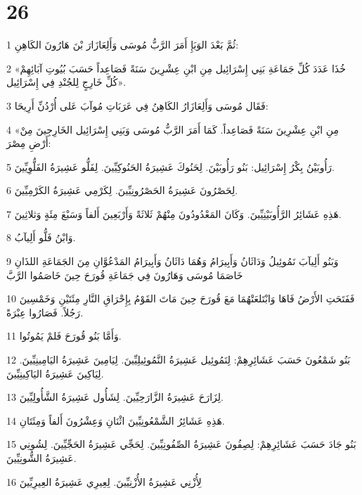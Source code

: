 \chapter{26}

\par 1 ثُمَّ بَعْدَ الوَبَإِ أَمَرَ الرَّبُّ مُوسَى وَأَلِعَازَارَ بْنَ هَارُونَ الكَاهِنِ:
\par 2 «خُذَا عَدَدَ كُلِّ جَمَاعَةِ بَنِي إِسْرَائِيل مِنِ ابْنِ عِشْرِينَ سَنَةً فَصَاعِداً حَسَبَ بُيُوتِ آبَائِهِمْ كُلِّ خَارِجٍ لِلجُنْدِ فِي إِسْرَائِيل».
\par 3 فَقَال مُوسَى وَأَلِعَازَارُ الكَاهِنُ فِي عَرَبَاتِ مُوآبَ عَلى أُرْدُنِّ أَرِيحَا:
\par 4 «مِنِ ابْنِ عِشْرِينَ سَنَةً فَصَاعِداً. كَمَا أَمَرَ الرَّبُّ مُوسَى وَبَنِي إِسْرَائِيل الخَارِجِينَ مِنْ أَرْضِ مِصْرَ:
\par 5 رَأُوبَيْنُ بِكْرُ إِسْرَائِيل: بَنُو رَأُوبَيْنَ. لِحَنُوكَ عَشِيرَةُ الحَنُوكِيِّينَ. لِفَلُّو عَشِيرَةُ الفَلُّوِيِّينَ.
\par 6 لِحَصْرُونَ عَشِيرَةُ الحَصْرُونِيِّينَ. لِكَرْمِي عَشِيرَةُ الكَرْمِيِّينَ.
\par 7 هَذِهِ عَشَائِرُ الرَّأُوبَيْنِيِّينَ. وَكَانَ المَعْدُودُونَ مِنْهُمْ ثَلاثَةً وَأَرْبَعِينَ أَلفاً وَسَبْعَ مِئَةٍ وَثلاثِينَ.
\par 8 وَابْنُ فَلُّو أَلِيآبُ.
\par 9 وَبَنُو أَلِيآبَ نَمُوئِيلُ وَدَاثَانُ وَأَبِيرَامُ وَهُمَا دَاثَانُ وَأَبِيرَامُ المَدْعُوَّانِ مِنَ الجَمَاعَةِ اللذَانِ خَاصَمَا مُوسَى وَهَارُونَ فِي جَمَاعَةِ قُورَحَ حِينَ خَاصَمُوا الرَّبَّ
\par 10 فَفَتَحَتِ الأَرْضُ فَاهَا وَابْتَلعَتْهُمَا مَعَ قُورَحَ حِينَ مَاتَ القَوْمُ بِإِحْرَاقِ النَّارِ مِئَتَيْنِ وَخَمْسِينَ رَجُلاً. فَصَارُوا عِبْرَةً.
\par 11 وَأَمَّا بَنُو قُورَحَ فَلمْ يَمُوتُوا.
\par 12 بَنُو شَمْعُونَ حَسَبَ عَشَائِرِهِمْ: لِنَمُوئِيل عَشِيرَةُ النَّمُوئِيلِيِّينَ. لِيَامِينَ عَشِيرَةُ اليَامِينِيِّينَ. لِيَاكِينَ عَشِيرَةُ اليَاكِينِيِّينَ.
\par 13 لِزَارَحَ عَشِيرَةُ الزَّارَحِيِّينَ. لِشَأُول عَشِيرَةُ الشَّأُولِيِّينَ.
\par 14 هَذِهِ عَشَائِرُ الشَّمْعُونِيِّينَ اثْنَانِ وَعِشْرُونَ أَلفاً وَمِئَتَانِ.
\par 15 بَنُو جَادَ حَسَبَ عَشَائِرِهِمْ: لِصِفُونَ عَشِيرَةُ الصِّفُونِيِّينَ. لِحَجِّي عَشِيرَةُ الحَجِّيِّينَ. لِشُونِي عَشِيرَةُ الشُّونِيِّينَ.
\par 16 لِأُزْنِي عَشِيرَةُ الأُزْنِيِّينَ. لِعِيرِي عَشِيرَةُ العِيرِيِّينَ
